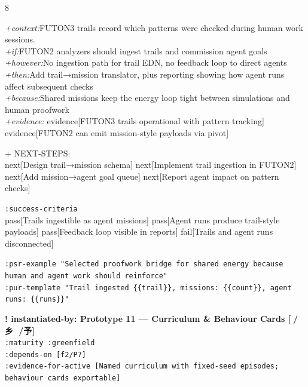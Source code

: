 \documentclass[landscape]{article}
\newcommand{\flexitag}[1]{\textcolor[gray]{0.35}{\textit{#1}}}
\newenvironment{devmapgreenfield}{%
  \def\FrameCommand{\colorbox{devmapgreenfieldbg}}%
  \setlength{\fboxsep}{2pt}%
  \MakeFramed{\advance\hsize-\width \FrameRestore}%
}{\endMakeFramed}
\begin{document}
\begin{paracol}{8}
\begin{devmapgreenfield}
  \flexitag{+context:}FUTON3 trails record which patterns were checked during human work sessions.\\
  \flexitag{+if:}FUTON2 analyzers should ingest trails and commission agent goals\\
  \flexitag{+however:}No ingestion path for trail EDN, no feedback loop to direct agents\\
  \flexitag{+then:}Add trail→mission translator, plus reporting showing how agent runs affect subsequent checks\\
  \flexitag{+because:}Shared missions keep the energy loop tight between simulations and human proofwork\\
  \flexitag{+evidence:} evidence[FUTON3 trails operational with pattern tracking] evidence[FUTON2 can emit mission-style payloads via pivot]\\
\par
  + NEXT-STEPS:\\
    next[Design trail→mission schema] next[Implement trail ingestion in FUTON2] next[Add mission→agent goal queue] next[Report agent impact on pattern checks]\\
\par
  \texttt{:\allowbreak{}success-\allowbreak{}criteria}\\
    pass[Trails ingestible as agent missions] pass[Agent runs produce trail-style payloads] pass[Feedback loop visible in reports] fail[Trails and agent runs disconnected]\\
\par
  \texttt{:\allowbreak{}psr-\allowbreak{}example "Selected proofwork bridge for shared energy because human and agent work should reinforce"}\\
  \texttt{:\allowbreak{}pur-\allowbreak{}template "Trail ingested \{\{trail\}\},\allowbreak{} missions:\allowbreak{} \{\{count\}\},\allowbreak{} agent runs:\allowbreak{} \{\{runs\}\}"}\\
\par
\par
\end{devmapgreenfield}
\begin{devmapgreenfield}
\textbf{! instantiated-by: Prototype 11 — Curriculum \& Behaviour Cards [🎴/乡 🐜/予]}\\
  \texttt{:\allowbreak{}maturity :\allowbreak{}greenfield}\\
  \texttt{:\allowbreak{}depends-\allowbreak{}on [f2/\allowbreak{}P7]}\\
  \texttt{:\allowbreak{}evidence-\allowbreak{}for-\allowbreak{}active [Named curriculum with fixed-\allowbreak{}seed episodes;\allowbreak{} behaviour cards exportable]}\\

\end{devmapgreenfield}
\end{paracol}
\end{document}
